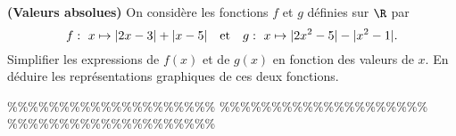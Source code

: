 



\begin{exercice}  \;
\textbf{(Valeurs absolues)}
On consid\`ere les fonctions $f$ et $g$ d\'efinies sur $\R$ par
$$f:\ x\mapsto |2x-3|+|x-5|\quad \hbox{et}\quad g:\ x\mapsto |2x^2-5|-|x^2-1|.$$
Simplifier les expressions de $f(x)$ et de $g(x)$ en fonction des valeurs de $x$. En d\'eduire les repr\'esentations graphiques de ces deux fonctions.
\end{exercice}


\%\%\%\%\%\%\%\%\%\%\%\%\%\%\%\%\%\%\%\%
\%\%\%\%\%\%\%\%\%\%\%\%\%\%\%\%\%\%\%\%
\%\%\%\%\%\%\%\%\%\%\%\%\%\%\%\%\%\%\%\%



